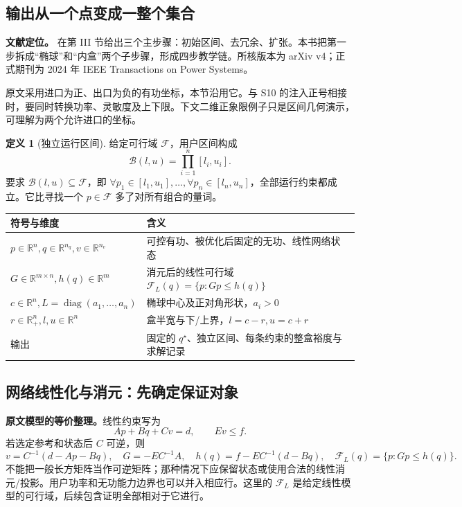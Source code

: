 \documentclass[UTF8,11pt,fontset=fandol,openany,oneside]{ctexbook}
\newcommand{\R}{\mathbb{R}}
\DeclareMathOperator{\diag}{diag}
\theoremstyle{definition}
\newtheorem{definition}[theorem]{定义}
\theoremstyle{remark}
\numberwithin{equation}{chapter}
\begin{document}
\subsection{输出从一个点变成一整个集合}

\textbf{文献定位。}\citet{S11} 在第 III 节给出三个主步骤：初始区间、去冗余、扩张。本书把第一步拆成“椭球”和“内盒”两个子步骤，形成四步教学链。所核版本为 arXiv v4；正式期刊为 2024 年 IEEE Transactions on Power Systems。

原文采用进口为正、出口为负的有功坐标，本节沿用它。与 S10 的注入正号相接时，要同时转换功率、灵敏度及上下限。下文二维正象限例子只是区间几何演示，可理解为两个允许进口的坐标。

\begin{definition}[独立运行区间]
给定可行域 $\mathcal F$，用户区间构成
\[
 \mathcal B(l,u)=\prod_{i=1}^n[l_i,u_i].
\]
要求 $\mathcal B(l,u)\subseteq\mathcal F$，即
$\forall p_1\in[l_1,u_1],\ldots,\forall p_n\in[l_n,u_n]$，全部运行约束都成立。它比寻找一个 $p\in\mathcal F$ 多了对所有组合的量词。
\end{definition}

\begin{center}
\begin{tabularx}{\textwidth}{@{}lX@{}}
\toprule
符号与维度 & 含义 \\
\midrule
$p\in\R^n,q\in\R^{n_q},v\in\R^{n_v}$ & 可控有功、被优化后固定的无功、线性网络状态 \\
$G\in\R^{m\times n},h(q)\in\R^m$ & 消元后的线性可行域 $\mathcal F_L(q)=\{p:Gp\le h(q)\}$ \\
$c\in\R^n,L=\diag(a_1,\ldots,a_n)$ & 椭球中心及正对角形状，$a_i>0$ \\
$r\in\R_+^n,l,u\in\R^n$ & 盒半宽与下/上界，$l=c-r,u=c+r$ \\
输出 & 固定的 $q^\star$、独立区间、每条约束的整盒裕度与求解记录 \\
\bottomrule
\end{tabularx}
\end{center}

\subsection{网络线性化与消元：先确定保证对象}

\textbf{原文模型的等价整理。}线性约束写为
\begin{equation}
 Ap+Bq+Cv=d,\qquad Ev\le f.
 \label{eq:oe_s11_linear}
\end{equation}
若选定参考和状态后 $C$ 可逆，则
\begin{equation}
 v=C^{-1}(d-Ap-Bq),\quad
 G=-EC^{-1}A,\quad h(q)=f-EC^{-1}(d-Bq),\quad
 \mathcal F_L(q)=\{p:Gp\le h(q)\}.
 \label{eq:oe_s11_eliminate}
\end{equation}
不能把一般长方矩阵当作可逆矩阵；那种情况下应保留状态或使用合法的线性消元/投影。用户功率和无功能力边界也可以并入相应行。这里的 $\mathcal F_L$ 是给定线性模型的可行域，后续包含证明全部相对于它进行。
\end{document}
